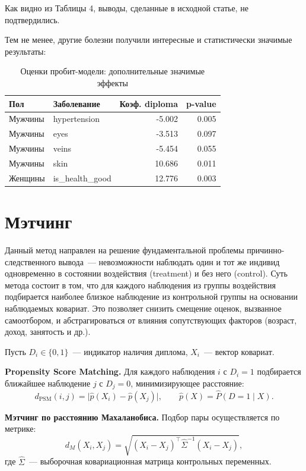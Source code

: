 \documentclass[a4paper,12pt]{article}
\begin{document}
Как видно из Таблицы 4, выводы, сделанные в исходной статье, не подтвердились.

Тем не менее, другие болезни получили интересные и статистически значимые результаты:

\begin{table}[H]
\centering
\caption{Оценки пробит-модели: дополнительные значимые эффекты}
\begin{tabular}{@{}llrr@{}}
\toprule
\textbf{Пол} & \textbf{Заболевание} & \textbf{Коэф. diploma} & \textbf{p-value} \\
\midrule
Мужчины & hypertension    &  -5.002 & 0.005 \\
Мужчины & eyes            &  -3.513 & 0.097 \\
Мужчины & veins           &  -5.454 & 0.055 \\
Мужчины & skin            &  10.686 & 0.011 \\
Женщины & is\_health\_good & 12.776  & 0.003 \\
\bottomrule
\end{tabular}
\end{table}
\section{Мэтчинг}
Данный метод направлен на решение фундаментальной проблемы причинно-следственного вывода~---
невозможности наблюдать один и тот же индивид одновременно в состоянии воздействия (treatment) и без него (control).
Суть метода состоит в том, что для каждого наблюдения из группы воздействия подбирается наиболее близкое наблюдение
из контрольной группы на основании наблюдаемых ковариат.
Это позволяет снизить смещение оценок, вызванное самоотбором, и абстрагироваться от влияния сопутствующих факторов
(возраст, доход, занятость и др.).

Пусть $D_i \in \{0,1\}$~--- индикатор наличия диплома, $X_i$~--- вектор ковариат.

\textbf{Propensity Score Matching.} Для каждого наблюдения $i$ с $D_i = 1$ подбирается ближайшее наблюдение $j$ с $D_j = 0$, минимизирующее расстояние:
$$d_{\mathrm{PSM}}(i,j) = \bigl|\hat{p}(X_i) - \hat{p}(X_j)\bigr|, \qquad \hat{p}(X) = \widehat{P}(D=1\mid X).$$

\textbf{Мэтчинг по расстоянию Махаланобиса.} Подбор пары осуществляется по метрике:
$$d_M(X_i, X_j) = \sqrt{(X_i - X_j)^\top \hat{\Sigma}^{-1}(X_i - X_j)},$$
где $\hat{\Sigma}$~--- выборочная ковариационная матрица контрольных переменных.
\end{document}
